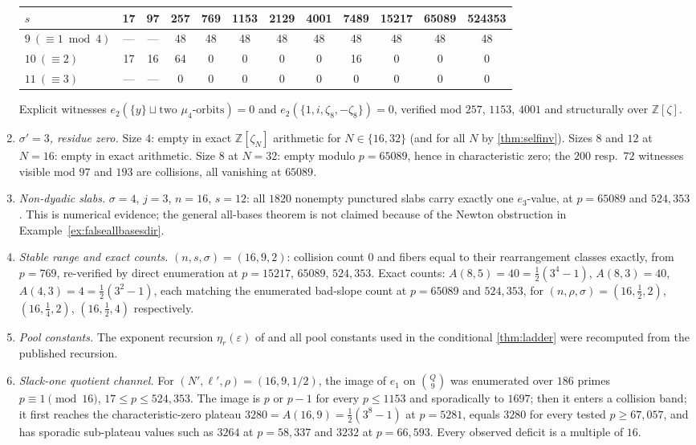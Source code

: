 \documentclass[11pt]{article}
\theoremstyle{definition}
\newcommand{\Z}{\mathbb Z}
\newcommand{\eps}{\varepsilon}
\newcommand{\Acl}{A}
\begin{document}
\begin{enumerate}[label=V\arabic*.,leftmargin=2.4em]
\begin{center}
\begin{tabular}{lccccccccccc}
\toprule
$s$ & 17 & 97 & 257 & 769 & 1153 & 2129 & 4001 & 7489 & 15217 & 65089 & 524353\\
\midrule
$9\ (\equiv1\bmod4)$ & --- & --- & 48 & 48 & 48 & 48 & 48 & 48 & 48 & 48 & 48\\
$10\ (\equiv2)$ & 17 & 16 & 64 & 0 & 0 & 0 & 0 & 16 & 0 & 0 & 0\\
$11\ (\equiv3)$ & --- & --- & 0 & 0 & 0 & 0 & 0 & 0 & 0 & 0 & 0\\
\bottomrule
\end{tabular}
\end{center}
Explicit witnesses $e_2(\{y\}\sqcup\text{two }\mu_4\text{-orbits})=0$ and $e_2(\{1,i,\zeta_8,-\zeta_8\})=0$, verified mod $257$, $1153$, $4001$ and structurally over $\Z[\zeta]$.
\item\emph{$\sigma'=3$, residue zero.}  Size $4$: empty in exact $\Z[\zeta_N]$ arithmetic for $N\in\{16,32\}$ (and for all $N$ by \cref{thm:selfinv}).  Sizes $8$ and $12$ at $N=16$: empty in exact arithmetic.  Size $8$ at $N=32$: empty modulo $p=65089$, hence in characteristic zero; the $200$ resp.\ $72$ witnesses visible mod $97$ and $193$ are collisions, all vanishing at $65089$.
\item\emph{Non-dyadic slabs.}  $\sigma=4$, $j=3$, $n=16$, $s=12$: all $1820$ nonempty punctured slabs carry exactly one $e_3$-value, at $p=65089$ and $524{,}353$.  This is numerical evidence; the general all-bases theorem is not claimed because of the Newton obstruction in Example~\ref{ex:falseallbasesdir}.
\item\emph{Stable range and exact counts.}  $(n,s,\sigma)=(16,9,2)$: collision count $0$ and fibers equal to their rearrangement classes exactly, from $p=769$, re-verified by direct enumeration at $p=15217$, $65089$, $524{,}353$.  Exact counts: $A(8,5)=40=\tfrac12(3^4-1)$, $A(8,3)=40$, $A(4,3)=4=\tfrac12(3^2-1)$, each matching the enumerated bad-slope count at $p=65089$ and $524{,}353$, for $(n,\rho,\sigma)=(16,\tfrac12,2)$, $(16,\tfrac14,2)$, $(16,\tfrac12,4)$ respectively.
\item\emph{Pool constants.}  The exponent recursion $\eta_r(\eps)$ of \cite{OSV24} and all pool constants used in the conditional \cref{thm:ladder} were recomputed from the published recursion.
\item\emph{Slack-one quotient channel.}  For $(N',\ell',\rho)=(16,9,1/2)$, the image of $e_1$ on $\binom Q9$ was enumerated over $186$ primes $p\equiv1\pmod{16}$, $17\le p\le524{,}353$.  The image is $p$ or $p-1$ for every $p\le1153$ and sporadically to $1697$; then it enters a collision band; it first reaches the characteristic-zero plateau $3280=\Acl(16,9)=\tfrac12(3^8-1)$ at $p=5281$, equals $3280$ for every tested $p\ge67{,}057$, and has sporadic sub-plateau values such as $3264$ at $p=58{,}337$ and $3232$ at $p=66{,}593$.  Every observed deficit is a multiple of $16$.

\end{enumerate}
\end{document}
